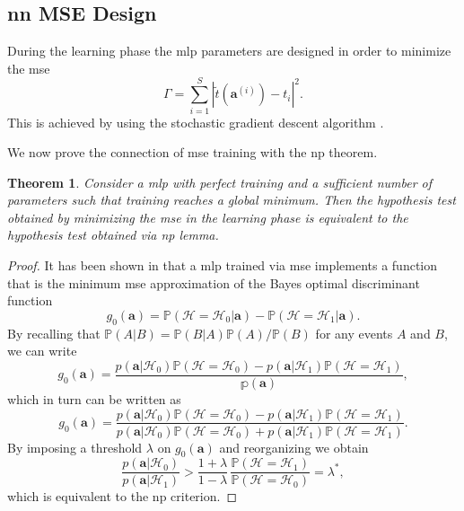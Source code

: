 \documentclass[draftcls,onecolumn,12pt]{IEEEtran}
\newcommand{\ai}{\bm{a}^{(i)}}
\newtheorem{theorem}{Theorem}
\begin{document}
\subsection{\ac{nn} MSE Design}
\label{sec: mse_train}

During the learning phase the \ac{mlp} parameters are designed in order to minimize 
the \ac{mse} 
\begin{equation}
\Gamma = \sum_{i=1}^S |\tilde{t}(\ai) - t_i|^2.
\end{equation}
This is achieved by using the stochastic gradient descent algorithm \cite{Bishop2006}.

We now prove the connection of \ac{mse} training with the \ac{np} theorem.
\begin{theorem}
\label{th:nn_np}
Consider a \ac{mlp} with perfect training and a sufficient number of parameters such that training reaches a global minimum. Then the hypothesis test obtained by minimizing the \ac{mse} in the learning phase is equivalent to the hypothesis test obtained via \ac{np} lemma.
\end{theorem}
\begin{proof}
It has been shown in \cite{Ruck-90} that a \ac{mlp} trained via \ac{mse} implements a function that is the minimum \ac{mse} approximation of the Bayes optimal discriminant function
\begin{equation}\label{eq:bayesDisc}
g_0(\bm{a}) = \mathbb{P}(\mathcal{H}=\mathcal{H}_0|\bm{a}) - \mathbb{P}(\mathcal{H}=\mathcal{H}_1|\bm{a}).
\end{equation} 
By recalling that $\mathbb{P}(A|B)=\mathbb{P}(B|A)\mathbb{P}(A)/\mathbb{P}(B)$ for any events $A$ and $B$, we can write
\begin{equation}
g_0(\bm{a}) = \frac{p(\bm{a}|\mathcal H_0){\mathbb P}(\mathcal{H}=\mathcal H_0) - p(\bm{a}|\mathcal H_1){\mathbb P}(\mathcal{H}=\mathcal H_1)}{\mathbb p(\bm{a})},
\end{equation}
which in turn can be written as
\begin{equation}
g_0(\bm{a}) = \frac{p(\bm{a}|\mathcal H_0){\mathbb P}(\mathcal{H}=\mathcal H_0) - p(\bm{a}|\mathcal H_1){\mathbb P}(\mathcal{H}=\mathcal H_1)}{p(\bm{a}|\mathcal H_0){\mathbb P}(\mathcal{H}=\mathcal H_0) + p(\bm{a}|\mathcal H_1){\mathbb P}(\mathcal{H}=\mathcal H_1)}.
\end{equation}
By imposing a threshold $\lambda$ on $g_0(\bm{a})$ and reorganizing we obtain
\begin{equation}
\frac{p(\bm{a}|\mathcal H_0)}{p(\bm{a}|\mathcal H_1)}> \frac{1 + \lambda}{1-\lambda} \, \frac{{\mathbb P}(\mathcal{H}=\mathcal H_1)}{{\mathbb P}(\mathcal{H}=\mathcal H_0)}  = \lambda^*,
\end{equation}
which is equivalent to the \ac{np} criterion.
\end{proof}
\end{document}

